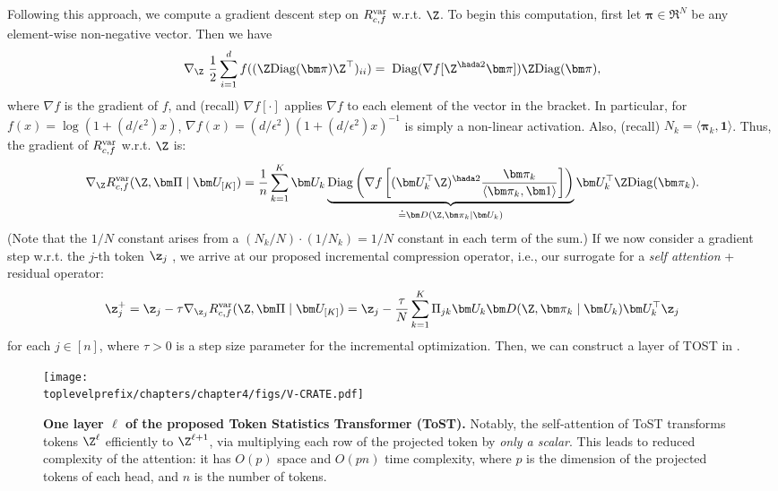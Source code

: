 \documentclass[../../book-main.tex]{subfiles}
\begin{document}
Following this approach, we compute a gradient descent step on $R_{c,f}^{\rm var}$ w.r.t. $\Z$.
To begin this computation, first let $\bm \pi \in \Re^N$ be any element-wise non-negative vector. Then we have
\begin{equation}\label{eq1:grad Rcf}
\nabla_{\Z} \ \frac{1}{2} \sum_{i = 1}^{d} f(  (\Z \mathrm{Diag}(\bm \pi) \Z^{\top} )_{ii}) %
= \; \mathrm{Diag}(\nabla f[ \Z^{\hada 2} \bm \pi] ) \Z \mathrm{Diag}(\bm \pi),
\end{equation}
where $\nabla f$ is the gradient of $f$, and (recall) $\nabla f[\cdot]$ applies $\nabla f$ to each element of the vector in the bracket. In particular, for $ f(x) = \log(1 + (d/\epsilon^{2}) x)$,  $\nabla f(x) = (d / \epsilon^{2}) (1+ (d / \epsilon^{2}) x)^{-1}$ is simply a non-linear activation. Also, (recall) $N_{k} = \langle \bm \pi_{k}, \bm 1\rangle$. Thus, the gradient of $R^{\rm var}_{c,f}$ w.r.t. $\Z$ is:
\begin{align}\label{eq2:grad Rcf}
    \nabla_{\Z} R^{\rm var}_{c,f}(\Z,\bm \Pi \mid \bm U_{[K]}) =  \frac{1}{n}
    \sum_{k=1}^K \bm U_{k} \underbrace{\mathrm{Diag} \left( \nabla f\left[ (\bm
    U_{k}^{\top} \Z)^{\hada 2}  \frac{\bm \pi_k}{\langle \bm \pi_{k}, \bm 1\rangle} \right] \right)}_{\doteq \bm D(\Z, \bm \pi_{k} \mid \bm U_{k})} \bm U_{k}^{\top} \Z \mathrm{Diag}(\bm \pi_k).
\end{align}
(Note that the $1/N$ constant arises from a $(N_{k}/N)\cdot (1/N_{k}) = 1/N$ constant in each term of the sum.) If we now consider a gradient step w.r.t. the $j$-th token $\z_j$
, we arrive at our proposed incremental compression operator, i.e., our surrogate for a \textit{self attention} + residual operator:
\vspace{-2mm}
\begin{equation}\label{eq:layer-operation-orig}
    \z_j^+ = \z_{j} - \tau \nabla_{\z_{j}}R_{c, f}^{\rm var}(\Z, \bm \Pi \mid \bm U_{[K]}) = \z_j - \frac{\tau}{N} \sum_{k=1}^K \Pi_{jk} \bm U_{k} \bm D(\Z, \bm \pi_{k} \mid \bm U_{k}) \bm U_{k}^{\top} \z_j
\end{equation}
for each \(j \in [n]\), where $\tau > 0$ is a step size parameter for the incremental optimization. Then, we can construct a layer of TOST in .  

\begin{figure}[t]
    \centering \texttt{[image: \\toplevelprefix/chapters/chapter4/figs/V-CRATE.pdf]}
    \vspace{-1mm}
    \caption{\small \textbf{One layer $\ell$ of the proposed Token Statistics Transformer (ToST).} Notably, the self-attention of ToST transforms tokens $\Z^{\ell}$ efficiently to $\Z^{\ell+1}$, via multiplying each row of the projected token by \textit{only a scalar}. This leads to reduced complexity of the attention: it has $O(p)$ space and $O(pn)$ time complexity, where $p$ is the dimension of the projected tokens of each head, and $n$ is the number of tokens.
    }
    \label{fig:vcrate-architecture}
\end{figure}
\end{document}
